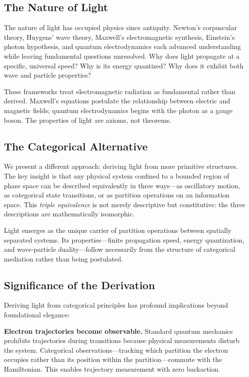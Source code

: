 \documentclass[aps,prl,twocolumn,superscriptaddress,floatfix]{revtex4-2}
\begin{document}
\subsection{The Nature of Light}

The nature of light has occupied physics since antiquity. Newton's corpuscular theory, Huygens' wave theory, Maxwell's electromagnetic synthesis, Einstein's photon hypothesis, and quantum electrodynamics each advanced understanding while leaving fundamental questions unresolved. Why does light propagate at a specific, universal speed? Why is its energy quantized? Why does it exhibit both wave and particle properties?

These frameworks treat electromagnetic radiation as fundamental rather than derived. Maxwell's equations postulate the relationship between electric and magnetic fields; quantum electrodynamics begins with the photon as a gauge boson. The properties of light are axioms, not theorems.

\subsection{The Categorical Alternative}

We present a different approach: deriving light from more primitive structures. The key insight is that any physical system confined to a bounded region of phase space can be described equivalently in three ways---as oscillatory motion, as categorical state transitions, or as partition operations on an information space. This \emph{triple equivalence} is not merely descriptive but constitutive: the three descriptions are mathematically isomorphic.

Light emerges as the unique carrier of partition operations between spatially separated systems. Its properties---finite propagation speed, energy quantization, and wave-particle duality---follow necessarily from the structure of categorical mediation rather than being postulated.

\subsection{Significance of the Derivation}

Deriving light from categorical principles has profound implications beyond foundational elegance:

\textbf{Electron trajectories become observable.} Standard quantum mechanics prohibits trajectories during transitions because physical measurements disturb the system. Categorical observations---tracking which partition the electron occupies rather than its position within the partition---commute with the Hamiltonian. This enables trajectory measurement with zero backaction.
\end{document}
